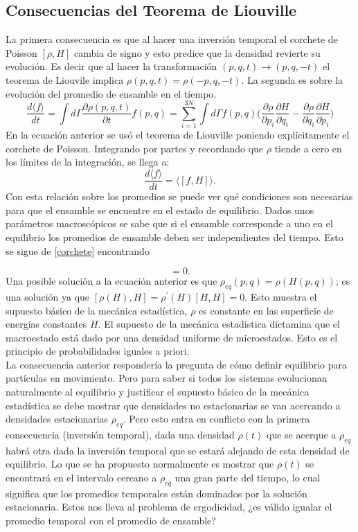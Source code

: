 \subsection{Consecuencias del Teorema de Liouville}
La primera consecuencia es que al hacer una inversión temporal el corchete de Poisson $[\rho, H]$ cambia de signo y esto predice que la densidad revierte su evolución. Es decir que al hacer la transformación $(p,q,t) \to (p,q,-t)$ el teorema de Liouvile implica $\rho(p,q,t)=\rho(-p,q,-t)$.
La segunda es sobre la evolución del promedio de ensamble en el tiempo.
\begin{equation} \label{corchete}
\frac{d \langle f \rangle}{dt}= \int d \Gamma \frac{\partial \rho(p,q,t)}{\partial t} f(p,q)= \sum_{i=1}^{3N} \int d\Gamma f(p,q) \Big( \frac{\partial \rho}{\partial p_{i}}\frac{\partial H}{\partial q_{i}} - \frac{\partial \rho}{\partial q_{i}}\frac{\partial H}{\partial p_{i}}  \Big)
\end{equation}
En la ecuación anterior se usó el teorema de Liouville poniendo explícitamente el corchete de Poisson. Integrando por partes y recordando que $\rho$ tiende a cero en los límites de la integración, se llega a:
\begin{equation}
\frac{d \langle f \rangle}{dt}= \langle [f,H] \rangle.
\end{equation}
Con esta relación sobre los promedios se puede ver qué condiciones son necesarias para que el ensamble se encuentre en el estado de equilibrio. Dados unos parámetros macroscópicos se sabe que si el ensamble corresponde a uno en el equilibrio los promedios de ensamble deben ser independientes del tiempo. Esto se sigue de \ref{corchete} encontrando 
 
\begin{equation}
[\rho_{eq}, H]=0.
\end{equation}
Una posible solución a la ecuación anterior es que $\rho_{eq}(p,q)=\rho(H(p,q))$; es una solución ya que $[\rho(H),H]=\rho^{'}(H)[H,H]=0$. Esto muestra el supuesto básico de la mecánica estadística, $\rho$ es constante en las superficie de energías constantes $H$. El supuesto de la mecánica estadística dictamina que el macroestado está dado por una densidad uniforme de microestados. Esto es el principio de probabilidades iguales  a priori.
\\
La consecuencia anterior respondería la pregunta de cómo definir equilibrio para partículas en movimiento. Pero para saber si todos los sistemas evolucionan naturalmente al equilibrio  y justificar el supuesto básico de la mecánica estadística se debe mostrar que densidades no estacionarias se van acercando a densidades estacionarias $\rho_{eq}$. Pero esto entra en conflicto con la primera consecuencia (inversión temporal), dada una densidad $\rho(t)$ que se acerque a $\rho_{eq}$ habrá otra dada la inversión temporal que se estará alejando de esta densidad de equilibrio. Lo que se ha propuesto normalmente es mostrar que $\rho(t)$ se encontrará en el intervalo cercano a $\rho_{eq}$ una gran parte del tiempo, lo cual significa que los promedios temporales están dominados por la solución estacionaria. Estos nos lleva al problema de ergodicidad, ¿es válido igualar el promedio temporal con el promedio de ensamble?
\\


